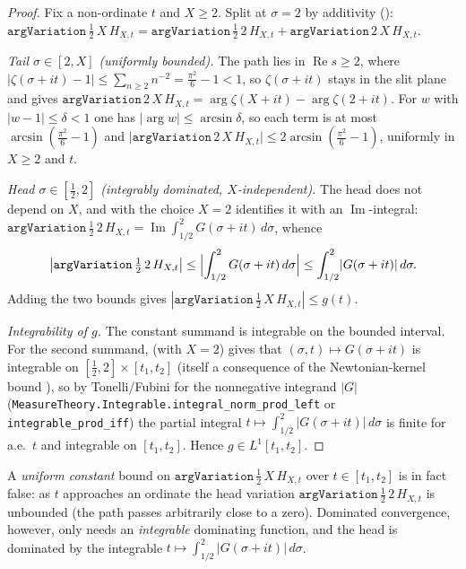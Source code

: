 \begin{proof}
\leanok
{}
Fix a non-ordinate $t$ and $X\ge2$. Split at $\sigma=2$ by additivity
():
$\texttt{argVariation}\,\tfrac12\,X\,H_{X,t}
=\texttt{argVariation}\,\tfrac12\,2\,H_{X,t}+\texttt{argVariation}\,2\,X\,H_{X,t}$.

\emph{Tail $\sigma\in[2,X]$ (uniformly bounded).} The path lies in
$\operatorname{Re}s\ge2$, where $|\zeta(\sigma+it)-1|\le\sum_{n\ge2}n^{-2}
=\tfrac{\pi^2}{6}-1<1$, so $\zeta(\sigma+it)$ stays in the slit plane and
 gives
$\texttt{argVariation}\,2\,X\,H_{X,t}=\arg\zeta(X+it)-\arg\zeta(2+it)$. For $w$ with
$|w-1|\le\delta<1$ one has $|\arg w|\le\arcsin\delta$, so each term is at most
$\arcsin(\tfrac{\pi^2}{6}-1)$ and
$\bigl|\texttt{argVariation}\,2\,X\,H_{X,t}\bigr|\le 2\arcsin(\tfrac{\pi^2}{6}-1)$,
uniformly in $X\ge2$ and $t$.

\emph{Head $\sigma\in[\tfrac12,2]$ (integrably dominated, $X$-independent).} The
head does not depend on $X$, and  with the choice $X=2$
identifies it with an $\operatorname{Im}$-integral:
$\texttt{argVariation}\,\tfrac12\,2\,H_{X,t}
=\operatorname{Im}\!\int_{1/2}^{2}G(\sigma+it)\,d\sigma$, whence
\[
  \bigl|\texttt{argVariation}\,\tfrac12\,2\,H_{X,t}\bigr|
  \le \Bigl|\int_{1/2}^{2}G(\sigma+it)\,d\sigma\Bigr|
  \le \int_{1/2}^{2}\lvert G(\sigma+it)\rvert\,d\sigma .
\]
Adding the two bounds gives $|\texttt{argVariation}\,\tfrac12\,X\,H_{X,t}|\le g(t)$.

\emph{Integrability of $g$.} The constant summand is integrable on the bounded
interval. For the second summand,  (with $X=2$)
gives that $(\sigma,t)\mapsto G(\sigma+it)$ is integrable on
$[\tfrac12,2]\times[t_1,t_2]$ (itself a consequence of the Newtonian-kernel bound
), so by Tonelli/Fubini for the nonnegative integrand
$|G|$ (\texttt{MeasureTheory.Integrable.integral\_norm\_prod\_left} or
\texttt{integrable\_prod\_iff}) the partial integral
$t\mapsto\int_{1/2}^{2}\lvert G(\sigma+it)\rvert\,d\sigma$ is finite for a.e.\ $t$
and integrable on $[t_1,t_2]$. Hence $g\in L^1[t_1,t_2]$.
\end{proof}

\begin{remark}
A \emph{uniform constant} bound on $\texttt{argVariation}\,\tfrac12\,X\,H_{X,t}$
over $t\in[t_1,t_2]$ is in fact false: as $t$ approaches an ordinate the head
variation $\texttt{argVariation}\,\tfrac12\,2\,H_{X,t}$ is unbounded (the path
passes arbitrarily close to a zero). Dominated convergence, however, only needs an
\emph{integrable} dominating function, and the head is dominated by the integrable
$t\mapsto\int_{1/2}^{2}\lvert G(\sigma+it)\rvert\,d\sigma$.
\end{remark}

